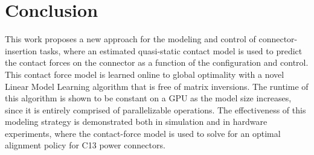 \section{Conclusion}
%
This work proposes a new approach for the modeling and control of connector-insertion tasks, where an estimated quasi-static contact model is used to predict the contact forces on the connector as a function of the configuration and control. This contact force model is learned online to global optimality with a novel Linear Model Learning algorithm that is free of matrix inversions. The runtime of this algorithm is shown to be constant on a GPU as the model size increases, since it is entirely comprised of parallelizable operations. The effectiveness of this modeling strategy is demonstrated both in simulation and in hardware experiments, where the contact-force model is used to solve for an optimal alignment policy for C13 power connectors. 



